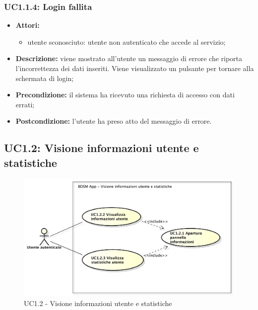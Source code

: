\subsubsection{UC1.1.4: Login fallita}

\begin{itemize}
    \item \textbf{Attori:}
    \begin{itemize}
        \item utente sconosciuto: utente non autenticato che accede al servizio;
    \end{itemize}
    \item \textbf{Descrizione:} viene mostrato all'utente un messaggio di errore che riporta l'incorrettezza dei dati inseriti. Viene visualizzato un pulsante per tornare alla schermata di login;
    \item \textbf{Precondizione:} il sistema ha ricevuto una richiesta di accesso con dati errati;
    \item \textbf{Postcondizione:} l'utente ha preso atto del messaggio di errore.
\end{itemize}

\pagebreak

\subsection{UC1.2: Visione informazioni utente e statistiche}

\begin{figure}[htbp]
    \centering
    \centerline{\includegraphics[scale=0.45]{./images/UC1_2.pdf}}
    \caption{UC1.2 - Visione informazioni utente e statistiche}
\end{figure}

